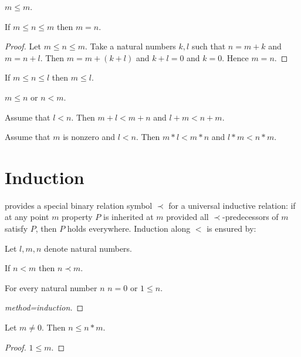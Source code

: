 \documentclass[11pt]{article}
\begin{document}
\begin{forthel}

\begin{lemma}
$m \leq m$.
\end{lemma}

\begin{lemma}
If $m \leq n \leq m$ then $m = n$.
\end{lemma}
\begin{proof}
Let $m \leq n \leq m$.
Take a natural numbers $k,l$ such that
$n = m + k$ and $m = n + l$.
Then $m = m + (k + l)$ and $k + l = 0$ and $k = 0$.
Hence $m = n$.
\end{proof}

\begin{lemma}
If $m \leq n \leq l$ then  $m \leq l$.
\end{lemma}

\begin{axiom}
$m \leq n$ or $n < m$.
\end{axiom}

\begin{lemma}
Assume that $l < n$.
Then $m + l < m + n$ and $l + m < n + m$.
\end{lemma}

\begin{lemma}
Assume that $m$ is nonzero and $l < n$.
Then $m * l < m * n$ and $l * m < n * m$.
\end{lemma}

\end{forthel}


\section{Induction}

\Naproche provides a special binary relation
symbol $\prec$ for a universal inductive relation: if at any
point $m$ property $P$ is inherited at $m$ provided all
$\prec$-predecessors of $m$ satisfy $P$, then $P$ holds everywhere.
Induction along $<$ is ensured by:

\begin{forthel}
Let $l,m,n$ denote natural numbers.

\begin{axiom}
If $n < m$ then $n \prec m$.
\end{axiom}

\begin{lemma}
For every natural number $n$ $n = 0$ or $1 \leq n$.
\end{lemma}
\begin{proof}[method=induction]
\end{proof}

\begin{lemma}
Let $m \neq 0$. Then $n \leq n * m$.
\end{lemma}
\begin{proof}
$1 \leq m$.
\end{proof}

\end{forthel}
\end{document}
